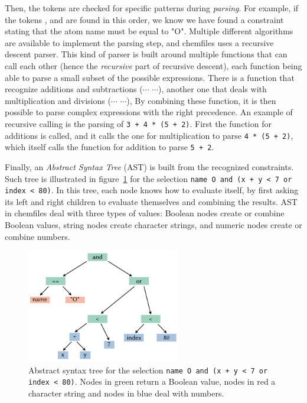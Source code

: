 \documentclass[thesis]{subfiles}
\begin{document}
Then, the tokens are checked for specific patterns during \emph{parsing}. For
example, if the tokens , \token{==} and  are found in
this order, we know we have found a constraint stating that the atom name must be
equal to "O". Multiple different algorithms are available to implement the
parsing step, and chemfiles uses a recursive descent parser. This kind of parser
is built around multiple functions that can call each other (hence the
\emph{recursive} part of recursive descent), each function being able to parse a
small subset of the possible expressions. There is a function that recognize
additions and subtractions ($\cdots$ \token{+|-} $\cdots$), another one that
deals with multiplication and divisions ($\cdots$ \token{*|/} $\cdots$), \etc By
combining these function, it is then possible to parse complex expressions with
the right precedence. An example of recursive calling is the parsing of
\texttt{3 + 4 * (5 + 2)}. First the function for additions is called, and it
calls the one for multiplication to parse \texttt{4 * (5 + 2)}, which itself
calls the function for addition to parse \texttt{5 + 2}.

Finally, an \emph{Abstract Syntax Tree} (AST) is built from the recognized
constraints. Such tree is illustrated in figure~\ref{fig:chemfiles:selection-ast}
for the selection \texttt{name O and (x + y < 7 or index < 80)}. In this tree,
each node knows how to evaluate itself, by first asking its left and right
children to evaluate themselves and combining the results. AST in chemfiles deal
with three types of values: Boolean nodes create or combine Boolean values,
string nodes create character strings, and numeric nodes create or combine
numbers.

\begin{figure}[ht]
    \centering
    \includegraphics[width=0.6\textwidth]{figures/images/chemfiles-selection-ast}
    \caption{Abstract syntax tree for the selection \texttt{name O and (x + y <
    7 or index < 80)}. Nodes in green return a Boolean value, nodes in red a
    character string and nodes in blue deal with numbers.}
    \label{fig:chemfiles:selection-ast}
\end{figure}
\end{document}
